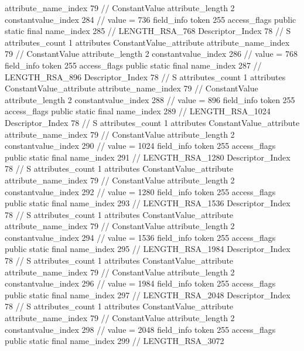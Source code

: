 {{{{{{{					attribute_name_index	79		// ConstantValue
					attribute_length	2
					constantvalue_index	284		// value = 736
				}
				}
			}
			field_info {
				token	255
				access_flags	public static final
				name_index	285		// LENGTH_RSA_768
				Descriptor_Index	78		// S
				attributes_count	1
				attributes {
				ConstantValue_attribute {
					attribute_name_index	79		// ConstantValue
					attribute_length	2
					constantvalue_index	286		// value = 768
				}
				}
			}
			field_info {
				token	255
				access_flags	public static final
				name_index	287		// LENGTH_RSA_896
				Descriptor_Index	78		// S
				attributes_count	1
				attributes {
				ConstantValue_attribute {
					attribute_name_index	79		// ConstantValue
					attribute_length	2
					constantvalue_index	288		// value = 896
				}
				}
			}
			field_info {
				token	255
				access_flags	public static final
				name_index	289		// LENGTH_RSA_1024
				Descriptor_Index	78		// S
				attributes_count	1
				attributes {
				ConstantValue_attribute {
					attribute_name_index	79		// ConstantValue
					attribute_length	2
					constantvalue_index	290		// value = 1024
				}
				}
			}
			field_info {
				token	255
				access_flags	public static final
				name_index	291		// LENGTH_RSA_1280
				Descriptor_Index	78		// S
				attributes_count	1
				attributes {
				ConstantValue_attribute {
					attribute_name_index	79		// ConstantValue
					attribute_length	2
					constantvalue_index	292		// value = 1280
				}
				}
			}
			field_info {
				token	255
				access_flags	public static final
				name_index	293		// LENGTH_RSA_1536
				Descriptor_Index	78		// S
				attributes_count	1
				attributes {
				ConstantValue_attribute {
					attribute_name_index	79		// ConstantValue
					attribute_length	2
					constantvalue_index	294		// value = 1536
				}
				}
			}
			field_info {
				token	255
				access_flags	public static final
				name_index	295		// LENGTH_RSA_1984
				Descriptor_Index	78		// S
				attributes_count	1
				attributes {
				ConstantValue_attribute {
					attribute_name_index	79		// ConstantValue
					attribute_length	2
					constantvalue_index	296		// value = 1984
				}
				}
			}
			field_info {
				token	255
				access_flags	public static final
				name_index	297		// LENGTH_RSA_2048
				Descriptor_Index	78		// S
				attributes_count	1
				attributes {
				ConstantValue_attribute {
					attribute_name_index	79		// ConstantValue
					attribute_length	2
					constantvalue_index	298		// value = 2048
				}
				}
			}
			field_info {
				token	255
				access_flags	public static final
				name_index	299		// LENGTH_RSA_3072
}}}}}
